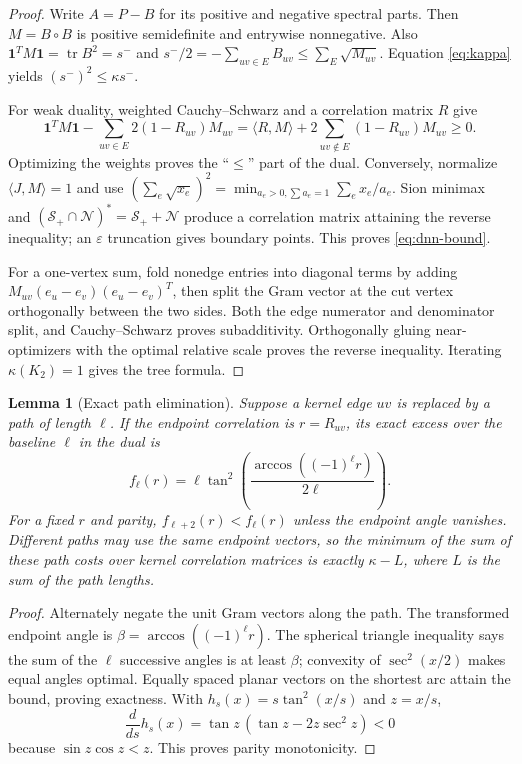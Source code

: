 \documentclass[11pt]{article}
\newtheorem{lemma}[theorem]{Lemma}
\theoremstyle{remark}
\newcommand{\sminus}{s^-}
\newcommand{\one}{\mathbf 1}
\begin{document}
\begin{proof}
Write $A=P-B$ for its positive and negative spectral parts.  Then
$M=B\circ B$ is positive semidefinite and entrywise nonnegative.  Also
$\one^TM\one=\operatorname{tr}B^2=\sminus$ and
$\sminus/2=-\sum_{uv\in E}B_{uv}\leq\sum_E\sqrt{M_{uv}}$.
Equation \eqref{eq:kappa} yields $(\sminus)^2\leq\kappa\sminus$.

For weak duality, weighted Cauchy--Schwarz and a correlation matrix $R$ give
\[
 \one^TM\one-\sum_{uv\in E}2(1-R_{uv})M_{uv}
 =\langle R,M\rangle+2\sum_{uv\notin E}(1-R_{uv})M_{uv}\geq0.
\]
Optimizing the weights proves the ``$\leq$'' part of the dual.  Conversely,
normalize $\langle J,M\rangle=1$ and use
$(\sum_e\sqrt{x_e})^2=\min_{a_e>0,\sum a_e=1}\sum_ex_e/a_e$.
Sion minimax and $(\mathcal S_+\cap\mathcal N)^*=\mathcal S_++\mathcal N$
produce a correlation matrix attaining the reverse inequality; an
$\varepsilon$ truncation gives boundary points.  This proves
\eqref{eq:dnn-bound}.

For a one-vertex sum, fold nonedge entries into diagonal terms by adding
$M_{uv}(e_u-e_v)(e_u-e_v)^T$, then split the Gram vector at the cut vertex
orthogonally between the two sides.  Both the edge numerator and denominator
split, and Cauchy--Schwarz proves subadditivity.  Orthogonally gluing
near-optimizers with the optimal relative scale proves the reverse inequality.
Iterating $\kappa(K_2)=1$ gives the tree formula.
\end{proof}

\begin{lemma}[Exact path elimination]\label{lem:path}
Suppose a kernel edge $uv$ is replaced by a path of length $\ell$.  If the
endpoint correlation is $r=R_{uv}$, its exact excess over the baseline
$\ell$ in the dual is
\begin{equation}\label{eq:path}
 f_\ell(r)=\ell\tan^2\!\left(
 \frac{\arccos((-1)^\ell r)}{2\ell}\right).
\end{equation}
For a fixed $r$ and parity, $f_{\ell+2}(r)<f_\ell(r)$ unless the endpoint
angle vanishes.  Different paths may use the same endpoint vectors, so the
minimum of the sum of these path costs over kernel correlation matrices is
exactly $\kappa-L$, where $L$ is the sum of the path lengths.
\end{lemma}

\begin{proof}
Alternately negate the unit Gram vectors along the path.  The transformed
endpoint angle is $\beta=\arccos((-1)^\ell r)$.  The spherical triangle
inequality says the sum of the $\ell$ successive angles is at least $\beta$;
convexity of $\sec^2(x/2)$ makes equal angles optimal.  Equally spaced planar
vectors on the shortest arc attain the bound, proving exactness.  With
$h_s(x)=s\tan^2(x/s)$ and $z=x/s$,
\[
 \frac{d}{ds}h_s(x)=\tan z\,(\tan z-2z\sec^2z)<0
\]
because $\sin z\cos z<z$.  This proves parity monotonicity.
\end{proof}
\end{document}
